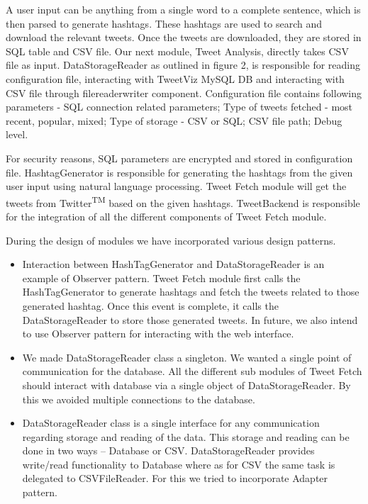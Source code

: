 \documentclass[11pt]{article}
\begin{document}
A user input can be anything from a single word to a complete sentence, which is then parsed to generate hashtags. These hashtags are used to search and download the relevant tweets. Once the tweets are downloaded, they are stored in SQL table and CSV file. Our next module, Tweet Analysis, directly takes CSV file as input. DataStorageReader as outlined in figure 2, is responsible for reading configuration file, interacting with TweetViz MySQL DB and interacting with CSV file through filereaderwriter component. Configuration file contains following parameters - SQL connection related parameters; Type of tweets fetched - most recent, popular, mixed; Type of storage - CSV or SQL; CSV file path; Debug level.
 
For security reasons, SQL parameters are encrypted and stored in configuration file. HashtagGenerator is responsible for generating the hashtags from the given user input using natural language processing. Tweet Fetch module will get the tweets from Twitter\textsuperscript{TM} based on the given hashtags. TweetBackend is responsible for the integration of all the different components of Tweet Fetch module. 

During the design of modules we have incorporated various design patterns.
\begin{itemize}
\item Interaction between HashTagGenerator and DataStorageReader is an example of Observer pattern. Tweet Fetch module first calls the HashTagGenerator to generate hashtags and fetch the tweets related to those generated hashtag. Once this event is complete, it calls the DataStorageReader to store those generated tweets. In future, we also intend to use Observer pattern for interacting with the web interface. 
\item We made DataStorageReader class a singleton. We wanted a single point of communication for the database. All the different sub modules of Tweet Fetch should interact with database via a single object of DataStorageReader. By this we avoided multiple connections to the database.
\item DataStorageReader class is a single interface for any communication regarding storage and reading of the data. This storage and reading can be done in two ways – Database or CSV. DataStorageReader provides write/read functionality to Database where as for CSV the same task is delegated to CSVFileReader. For this we tried to incorporate Adapter pattern.
\end{itemize} 
\end{document}
